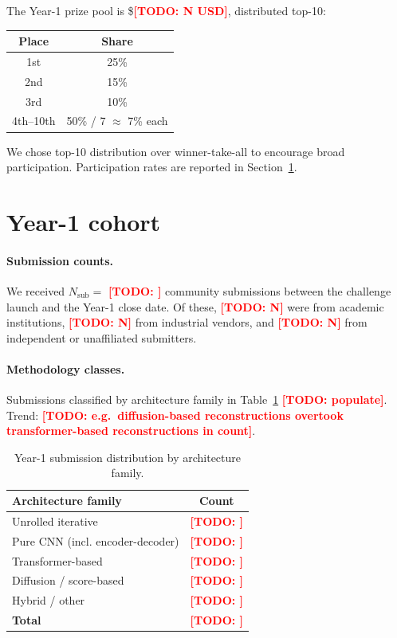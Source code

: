 \documentclass[twoside,11pt]{article}
\newcommand{\todo}[1]{\textcolor{red}{\textbf{[TODO: #1]}}}
\begin{document}
The Year-1 prize pool is \$\todo{N USD}, distributed top-10:

\begin{table}[h]
    \centering
    \begin{tabular}{cc}
        \toprule
        \textbf{Place} & \textbf{Share} \\
        \midrule
        1st      & 25\% \\
        2nd      & 15\% \\
        3rd      & 10\% \\
        4th--10th & 50\% / 7 $\approx$ 7\% each \\
        \bottomrule
    \end{tabular}
\end{table}

We chose top-10 distribution over winner-take-all to encourage broad participation. Participation rates are reported in Section~\ref{sec:year1_cohort}.

\section{Year-1 cohort}
\label{sec:year1_cohort}

\paragraph{Submission counts.} We received $N_{\textrm{sub}} = $ \todo{} community submissions between the challenge launch and the Year-1 close date. Of these, \todo{N} were from academic institutions, \todo{N} from industrial vendors, and \todo{N} from independent or unaffiliated submitters.

\paragraph{Methodology classes.} Submissions classified by architecture family in Table~\ref{tab:method_classes} \todo{populate}. Trend: \todo{e.g.\ diffusion-based reconstructions overtook transformer-based reconstructions in count}.

\begin{table}[h]
    \centering
    \begin{tabular}{lc}
        \toprule
        \textbf{Architecture family} & \textbf{Count} \\
        \midrule
        Unrolled iterative           & \todo{} \\
        Pure CNN (incl. encoder-decoder) & \todo{} \\
        Transformer-based            & \todo{} \\
        Diffusion / score-based      & \todo{} \\
        Hybrid / other               & \todo{} \\
        \midrule
        \textbf{Total}               & \todo{} \\
        \bottomrule
    \end{tabular}
    \caption{Year-1 submission distribution by architecture family.}
    \label{tab:method_classes}
\end{table}
\end{document}
